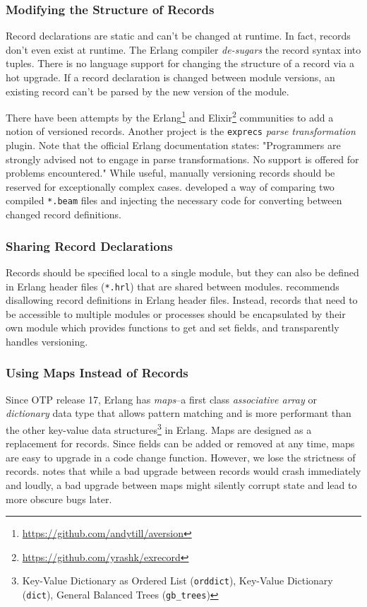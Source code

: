 \subsubsection{Modifying the Structure of Records}
Record declarations are static and can't be changed at runtime. In fact, records don't even exist at runtime. The Erlang compiler \emph{de-sugars} the record syntax into tuples. There is no language support for changing the structure of a record via a hot upgrade. If a record declaration is changed between module versions, an existing record can't be parsed by the new version of the module.

There have been attempts by the Erlang\footnote{\url{https://github.com/andytill/aversion}} and Elixir\footnote{\url{https://github.com/yrashk/exrecord}} communities to add a notion of versioned records. Another project is the \lstinline|exprecs| \emph{parse transformation} plugin. Note that the official Erlang documentation states: "Programmers are strongly advised not to engage in parse transformations. No support is offered for problems encountered."\cite{doc:otp} While useful, manually versioning records should be reserved for exceptionally complex cases. \cite{rebar3appup} developed a way of comparing two compiled \lstinline|*.beam| files and injecting the necessary code for converting between changed record definitions.

\subsubsection{Sharing Record Declarations}
Records should be specified local to a single module, but they can also be defined in Erlang header files (\lstinline|*.hrl|) that are shared between modules. \cite{davis:talk} recommends disallowing record definitions in Erlang header files. Instead, records that need to be accessible to multiple modules or processes should be encapsulated by their own module which provides functions to get and set fields, and transparently handles versioning.

\subsubsection{Using Maps Instead of Records}
Since OTP release 17, Erlang has \emph{maps}--a first class \emph{associative array} or \emph{dictionary} data type that allows pattern matching and is more performant than the other key-value data structures\footnote{Key-Value Dictionary as Ordered List (\lstinline|orddict|), Key-Value Dictionary (\lstinline|dict|), General Balanced Trees (\lstinline|gb_trees|)} in Erlang. Maps are designed as a replacement for records. Since fields can be added or removed at any time, maps are easy to upgrade in a code change function. However, we lose the strictness of records. \cite{ferd} notes that while a bad upgrade between records would crash immediately and loudly, a bad upgrade between maps might silently corrupt state and lead to more obscure bugs later.


